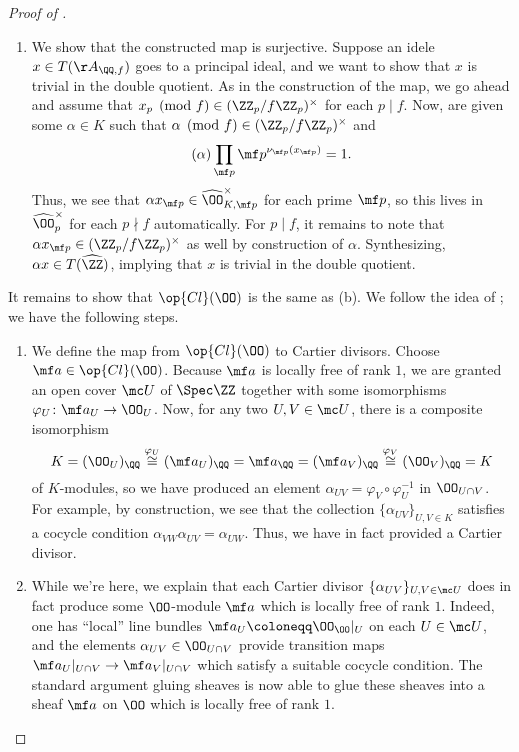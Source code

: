 \documentclass[../notes.tex]{subfiles}
\begin{document}
\begin{proof}[Proof of ]
\begin{enumerate}
		\item We show that the constructed map is surjective. Suppose an idele $x\in T(\AA_{\QQ,f})$ goes to a principal ideal, and we want to show that $x$ is trivial in the double quotient. As in the construction of the map, we go ahead and assume that $x_p\pmod f\in(\ZZ_p/f\ZZ_p)^\times$ for each $p\mid f$. Now, are given some $\alpha\in K$ such that $\alpha\pmod f\in(\ZZ_p/f\ZZ_p)^\times$ and
		\[(\alpha)\prod_{\mf p}\mf p^{\nu_{\mf p}(x_{\mf p})}=1.\]
		Thus, we see that $\alpha x_{\mf p}\in\widehat\OO_{K,\mf p}^\times$ for each prime $\mf p$, so this lives in $\widehat\OO_p^\times$ for each $p\nmid f$ automatically. For $p\mid f$, it remains to note that $\alpha x_{\mf p}\in(\ZZ_p/f\ZZ_p)^\times$ as well by construction of $\alpha$. Synthesizing, $\alpha x\in T(\widehat\ZZ)$, implying that $x$ is trivial in the double quotient.
	\end{enumerate}
	It remains to show that $\op{Cl}(\OO)$ is the same as (b). We follow the idea of ; we have the following steps.
	\begin{enumerate}
		\item We define the map from $\op{Cl}(\OO)$ to Cartier divisors. Choose $\mf a\in\op{Cl}(\OO)$. Because $\mf a$ is locally free of rank $1$, we are granted an open cover $\mc U$ of $\Spec\ZZ$ together with some isomorphisms $\varphi_U\colon\mf a_U\to\OO_U$. Now, for any two $U,V\in\mc U$, there is a composite isomorphism
		\[K=(\OO_U)_\QQ\stackrel{\varphi_U}\cong(\mf a_U)_\QQ=\mf a_\QQ=(\mf a_V)_\QQ\stackrel{\varphi_V}\cong(\OO_V)_\QQ=K\]
		of $K$-modules, so we have produced an element $\alpha_{UV}=\varphi_V\circ\varphi_U^{-1}$ in $\OO_{U\cap V}$. For example, by construction, we see that the collection $\{\alpha_{UV}\}_{U,V\in K}$ satisfies a cocycle condition $\alpha_{VW}\alpha_{UV}=\alpha_{UW}$. Thus, we have in fact provided a Cartier divisor.

		\item While we're here, we explain that each Cartier divisor $\{\alpha_{UV}\}_{U,V\in\mc U}$ does in fact produce some $\OO$-module $\mf a$ which is locally free of rank $1$. Indeed, one has ``local'' line bundles $\mf a_U\coloneqq\OO_\OO|_U$ on each $U\in\mc U$, and the elements $\alpha_{UV}\in\OO_{U\cap V}$ provide transition maps $\mf a_U|_{U\cap V}\to\mf a_V|_{U\cap V}$ which satisfy a suitable cocycle condition. The standard argument gluing sheaves is now able to glue these sheaves into a sheaf $\mf a$ on $\OO$ which is locally free of rank $1$.


\end{enumerate}
\end{proof}
\end{document}
